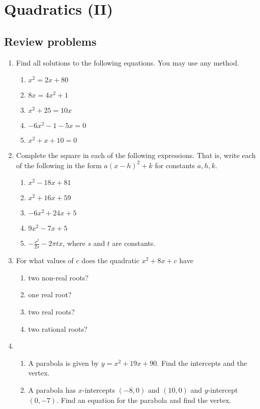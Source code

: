 \section{Quadratics (II)}

\subsection{Review problems}

\begin{enumerate}
\item Find all solutions to the following equations. You may use any method.
\begin{enumerate}
\item $x^2 = 2x + 80$
\item $8x = 4x^2 + 1$
\item $x^2 + 25 = 10x$
\item $-6x^2 - 1 - 5x = 0$
\item $x^2 + x + 10 = 0$
\end{enumerate}
\item Complete the square in each of the following expressions. That is, write each of the following in the form $a(x - h)^2 + k$ for constants $a,h,k$.
\begin{enumerate}
\item $x^2 - 18x + 81$
\item $x^2 + 16x + 59$
\item $-6x^2 + 24x + 5$
\item $9x^2 - 7x + 5$
\item $-\frac{x^2}{2s} - 2\pi tx$, where $s$ and $t$ are constants.
\end{enumerate}
\item For what values of $c$ does the quadratic $x^2 + 8x + c$ have
\begin{enumerate}
\item two non-real roots?
\item one real root?
\item two real roots?
\item two rational roots?
\end{enumerate}
\item \begin{enumerate}
\item A parabola is given by $y = x^2 + 19x + 90$. Find the intercepts and the vertex.
\item A parabola has $x$-intercepts $(-8,0)$ and $(10,0)$ and $y$-intercept $(0, -7)$. Find an equation for the parabola and find the vertex.

\end{enumerate}
\end{enumerate}
